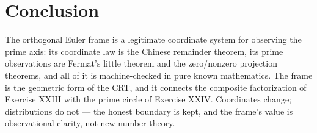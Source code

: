 \documentclass[sigplan,10pt,anonymous,review]{acmart}
\begin{document}
\section{Conclusion}

The orthogonal Euler frame is a legitimate coordinate system for
observing the prime axis: its coordinate law is the Chinese remainder
theorem, its prime observations are Fermat's little theorem and the
zero/nonzero projection theorems, and all of it is machine-checked in
pure known mathematics. The frame is the geometric form of the CRT, and
it connects the composite factorization of Exercise XXIII with the prime
circle of Exercise XXIV. Coordinates change; distributions do not ---
the honest boundary is kept, and the frame's value is observational
clarity, not new number theory.



\end{document}
